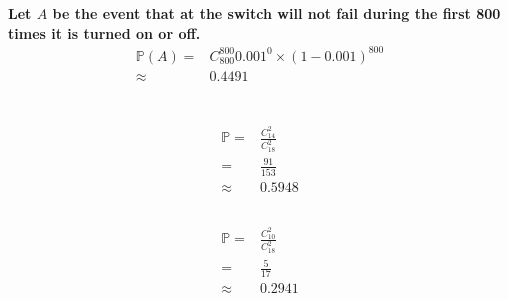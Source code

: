 \documentclass{article}
\begin{document}
    \section{}
        \paragraph{
            Let $A$ be the event that at the switch will not fail during the first 800 times it is turned on or off.
            \begin{equation*}
                \begin{split}
                    \mathbb{P}(A)=&C_{800}^800 0.001^{0}\times (1-0.001)^800\\
                        \approx&0.4491
                \end{split}
            \end{equation*}
        }           
    
    \section{}
        \subsection{}
            \paragraph{
                \begin{equation*}
                    \begin{split}
                        \mathbb{P}=&\frac{C_{14}^2}{C_{18}^2}\\
                            =&\frac{91}{153}\\
                            \approx&0.5948
                    \end{split}
                \end{equation*} 
            }
        \subsection{}
            \paragraph{
                \begin{equation*}
                    \begin{split}
                        \mathbb{P}=&\frac{C_{10}^2}{C_{18}^2}\\
                            =&\frac{5}{17}\\
                            \approx&0.2941
                    \end{split}
                \end{equation*}    
            }
\end{document}
